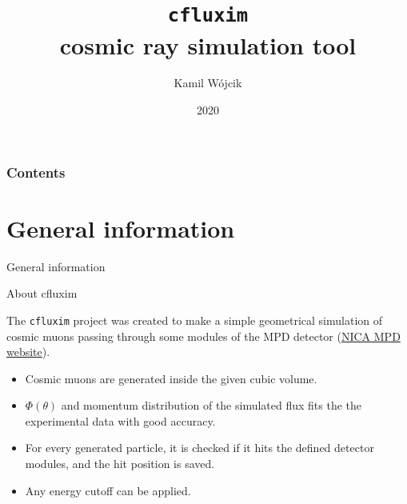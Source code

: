 \documentclass{beamer}
\title[cfluxim cosmic ray simulation tool]{\texttt{cfluxim}\\cosmic ray simulation tool}
\subtitle{}
\author[K. Wójcik]{Kamil Wójcik}
\institute[University of Silesia]{University of Silesia}
\date{2020}
\begin{document}
\begin{frame}
	\vfill
	\titlepage
	\vfill
\end{frame}


	\begin{frame}
		\frametitle{Contents}
		\tableofcontents
	\end{frame}


\section{General information}

\begin{frame}
\vfill
\centering
\Huge{General information}

\vfill
\end{frame}



\begin{frame}{About cfluxim}

The \texttt{cfluxim} project was created to make a simple geometrical simulation of cosmic muons passing through some modules of the MPD detector (\textcolor{blue}{\href{https://nica.jinr.ru/projects/mpd.php}{NICA MPD website}}).

\begin{itemize}
\item Cosmic muons are generated inside the given cubic volume.
\item $\Phi(\theta)$ and momentum distribution of the simulated flux fits the the experimental data with good accuracy.
\item For every generated particle, it is checked if it hits the defined detector modules, and the hit position is saved.
\item Any energy cutoff can be applied.
\end{itemize}

\end{frame}
\end{document}
